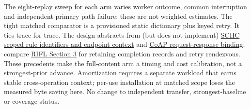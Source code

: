 \documentclass{article}
\begin{document}
The eight-replay sweep for each arm varies worker outcome, common
interruption and independent primary path failure; these are not
weighted estimates. The tight matched comparator is a provisioned
static dictionary plus keyed retry. It ties trace for trace. The
design abstracts from (but does not implement)
\href{https://www.rfc-editor.org/rfc/rfc8724.html#section-6}{SCHC
scoped rule identifiers and endpoint context} and
\href{https://www.rfc-editor.org/rfc/rfc9175.html#section-4}{CoAP
request-response binding}; compare
\href{https://web.stanford.edu/~ouster/cgi-bin/papers/rifl.pdf}{RIFL
Section 3} for retaining completion records and retry rendezvous.
These precedents make the full-content arm a timing and cost
calibration, not a strongest-prior advance. Amortization requires
a separate workload that earns stable cross-operation context; per-use
installation at matched scope loses the measured byte saving here.
No change to independent transfer, strongest-baseline or coverage status.
\end{document}
